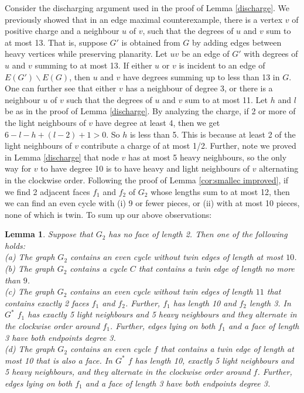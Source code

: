\documentclass{article}
\newcommand{\0}{\mathbb{0}}
\newcommand{\1}{\mathbb{1}}
\newtheorem{lemma}[theorem]{Lemma}
\newtheorem{remark}[theorem]{Remark}
\begin{document}
Consider the discharging argument used in the proof of Lemma \ref{discharge}. We previously showed that in an edge maximal counterexample, there is a vertex $v$ of positive charge and a neighbour $u$ of $v$, such that the degrees of $u$ and $v$ sum to at most 13. That is, suppose $G'$ is obtained from $G$  by adding edges between heavy vertices while preserving planarity. Let $uv$ be an edge of $G'$ with degrees of $u$ and $v$ summing to at most 13. If either $u$ or $v$ is incident to an edge of $E(G') \backslash E(G) $, then $u$ and $v$ have degrees summing up to less than 13 in $G$.  One can further see that either $v$ has a neighbour of degree 3, or there is a neighbour $u$ of $v$ such that  the degrees of $u$ and $v$ sum to at most 11. Let $h$ and $l$ be as in the proof of Lemma \ref{discharge}. By analyzing the charge, if 2 or more of the light neighbours of $v$ have degree at least 4, then we get $6-l-h+(l-2)+1 >0$. So $h$ is less than 5.  This is because at  least 2 of the light neighbours of $v$ contribute a charge of at most 1/2. Further, note we proved in Lemma \ref{discharge} that node $v$ has at most 5 heavy neighbours, so the only way for $v$ to have degree 10 is to have heavy and light neighbours of $v$ alternating in the clockwise order. Following the proof of Lemma \ref{cor:smallec improved},  if we find 2 adjacent faces $f_1$ and $f_2$ of $G_2$ whose lengths sum to at most 12, then  we can find an even cycle with (i) 9 or fewer pieces, or (ii) with at most 10 pieces, none of which is twin. To sum up our above observations:
\begin{lemma}\label{improved ec}
  Suppose that $G_2$ has no face of length 2. Then one of the following holds: \\
  (a) The graph $G_2$ contains an even cycle without
twin edges of length at most $10$. \\
(b) The graph $G_2$ contains a cycle $C$ that contains a twin edge of length no more than $9$. \\
(c) The graph $G_2$ contains an even cycle without twin edges of length $11$ that contains exactly 2 faces $f_1$ and $f_2$. Further, $f_1$ has length 10 and $f_2$ length 3. In $G^*$ $f_1$ has exactly 5 light neighbours and 5 heavy neighbours  and they alternate in the clockwise order around $f_1$. Further, edges lying on both $f_1$ and a  face of length 3 have both endpoints degree 3. \\
(d) The graph $G_2$ contains an even cycle $f$ that contains a twin edge of length at most 10 that is also a face.  In $G^*$ $f$ has length 10, exactly 5 light neighbours and 5 heavy neighbours, and they alternate in the clockwise order around $f$. Further, edges lying on both $f_1$ and a  face of length 3 have both endpoints degree 3. 
\end{lemma} 
\end{document}
